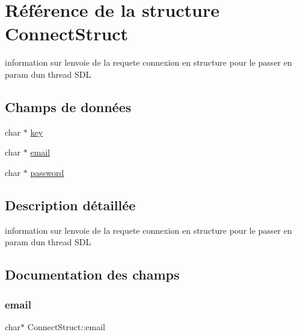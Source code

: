 \hypertarget{struct_connect_struct}{}\section{Référence de la structure Connect\+Struct}
\label{struct_connect_struct}


information sur l\textquotesingle{}envoie de la requete connexion en structure pour le passer en param d\textquotesingle{}un thread S\+DL  


\subsection*{Champs de données}
\begin{DoxyCompactItemize}
\item 
char $\ast$ \hyperlink{struct_connect_struct_a1289e2830836043833e4a86650c1633a}{key}
\item 
char $\ast$ \hyperlink{struct_connect_struct_a97ab5fd2177b8fca6964dd44393d964c}{email}
\item 
char $\ast$ \hyperlink{struct_connect_struct_a2cb458ca9913b6c6b0cfe6ad693d2c7a}{password}
\end{DoxyCompactItemize}


\subsection{Description détaillée}
information sur l\textquotesingle{}envoie de la requete connexion en structure pour le passer en param d\textquotesingle{}un thread S\+DL 

\subsection{Documentation des champs}
\mbox{\label{struct_connect_struct_a97ab5fd2177b8fca6964dd44393d964c}} 
\subsubsection{\texorpdfstring{email}{email}}
{\footnotesize\ttfamily char$\ast$ Connect\+Struct\+::email}

\mbox{\label{struct_connect_struct_a1289e2830836043833e4a86650c1633a}} 
